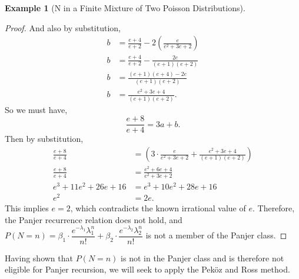 \documentclass[11pt]{amsart}
\theoremstyle{definition}
\newtheorem{example}{Example}
\theoremstyle{plain}
\begin{document}
\begin{example}[N in a Finite Mixture of Two Poisson Distributions]
\begin{proof}
And also by substitution,
\begin{align*}
    b &= \frac{e + 4}{e + 2} - 2\!\left(\frac{e}{e^2 + 3e + 2}\right)\\
    b &= \frac{e + 4}{e + 2} - \frac{2e}{(e + 1)(e + 2)}\\
    b &= \frac{(e + 1)(e + 4) - 2e}{(e + 1)(e + 2)}\\
    b &= \frac{e^2 + 3e + 4}{(e + 1)(e + 2)}.
\end{align*}
So we must have,
\[
    \frac{e + 8}{e + 4} = 3a + b.
\]
Then by substitution,
\begin{align*}
    \frac{e + 8}{e + 4}
        &= \left(3 \cdot \frac{e}{e^2 + 3e + 2}
           + \frac{e^2 + 3e + 4}{(e + 1)(e + 2)}\right)\\
    \frac{e + 8}{e + 4}
        &= \frac{e^2 + 6e + 4}{e^2 + 3e + 2}\\
    e^3 + 11e^2 + 26e + 16
        &= e^3 + 10e^2 + 28e + 16\\
    e^2 &= 2e.
\end{align*}
This implies $e = 2$, which contradicts the known irrational value of $e$.
Therefore, the Panjer recurrence relation does not hold, and
$P(N = n) = \beta_1 \cdot \dfrac{e^{-\lambda_1}\lambda_1^n}{n!}
           + \beta_2 \cdot \dfrac{e^{-\lambda_2}\lambda_2^n}{n!}$
is not a member of the Panjer class.
\qedhere
\end{proof}

Having shown that $P(N = n)$ is not in the Panjer class and is therefore not eligible for
Panjer recursion, we will seek to apply the Pek\"{o}z and Ross method.


\end{example}
\end{document}
